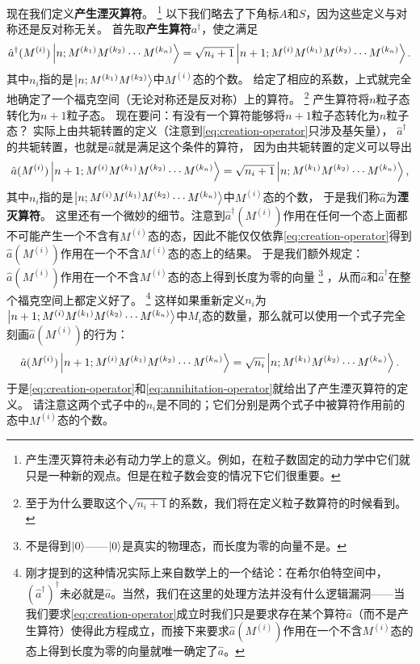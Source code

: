 \documentclass[UTF8, a4paper]{ctexart}
\begin{document}
现在我们定义\textbf{产生湮灭算符}。%
\footnote{产生湮灭算符未必有动力学上的意义。例如，在粒子数固定的动力学中它们就只是一种新的观点。但是在粒子数会变的情况下它们很重要。}%
以下我们略去了下角标$A$和$S$，因为这些定义与对称还是反对称无关。
首先取\textbf{产生算符}$a^\dagger$，使之满足
\begin{equation}
    \hat{a}^\dagger (M^{(i)}) \ket{n; M^{(k_1)} M^{(k_2)} \cdots M^{(k_n)}} = \sqrt{n_i + 1} \ket{n+1; M^{(i)} M^{(k_1)} M^{(k_2)} \cdots M^{(k_n)}}.
    \label{eq:creation-operator}
\end{equation}
其中${n_i}$指的是$\ket{n; M^{(k_1)} M^{(k_2)}}$中$M^{(i)}$态的个数。
给定了相应的系数，上式就完全地确定了一个福克空间（无论对称还是反对称）上的算符。%
\footnote{至于为什么要取这个$\sqrt{n_i + 1}$的系数，我们将在定义粒子数算符的时候看到。}
产生算符将$n$粒子态转化为$n+1$粒子态。
现在要问：有没有一个算符能够将$n+1$粒子态转化为$n$粒子态？
实际上由共轭转置的定义（注意到\eqref{eq:creation-operator}只涉及基矢量），
$\hat{a}^\dagger$的共轭转置，也就是$\hat{a}$就是满足这个条件的算符，
因为由共轭转置的定义可以导出
\[
    \hat{a} (M^{(i)}) \ket{n+1; M^{(i)} M^{(k_1)} M^{(k_2)} \cdots M^{(k_n)}} = \sqrt{n_i + 1} \ket{n; M^{(k_1)} M^{(k_2)} \cdots M^{(k_n)}},
\]
其中$n_i$指的是$\ket{n;M^{(i)} M^{(k_1)} M^{(k_2)} \cdots M^{(k_n)}}$中$M^{(i)}$态的个数，
于是我们称$\hat{a}$为\textbf{湮灭算符}。
这里还有一个微妙的细节。注意到$\hat{a}^\dagger(M^{(i)})$作用在任何一个态上面都不可能产生一个不含有$M^{(i)}$态的态，因此不能仅仅依靠\eqref{eq:creation-operator}得到$\hat{a}(M^{(i)})$作用在一个不含$M^{(i)}$态的态上的结果。
于是我们额外规定：$\hat{a}(M^{(i)})$作用在一个不含$M^{(i)}$态的态上得到长度为零的向量%
\footnote{不是得到$\ket{0}$——$\ket{0}$是真实的物理态，而长度为零的向量不是。}%
，从而$\hat{a}$和$\hat{a}^\dagger$在整个福克空间上都定义好了。%
\footnote{刚才提到的这种情况实际上来自数学上的一个结论：在希尔伯特空间中，$(\hat{a}^\dagger)^\dagger$未必就是$\hat{a}$。当然，我们在这里的处理方法并没有什么逻辑漏洞——当我们要求\eqref{eq:creation-operator}成立时我们只是要求存在某个算符$\hat{a}$（而不是产生算符）使得此方程成立，而接下来要求$\hat{a}(M^{(i)})$作用在一个不含$M^{(i)}$态的态上得到长度为零的向量就唯一确定了$\hat{a}$。}
这样如果重新定义$n_i$为$\ket{n+1; M^{(i)} M^{(k_1)} M^{(k_2)} \cdots M^{(k_n)}}$中$M_i$态的数量，那么就可以使用一个式子完全刻画$\hat{a}(M^{(i)})$的行为：
\begin{equation}
    \hat{a} (M^{(i)}) \ket{n+1; M^{(i)} M^{(k_1)} M^{(k_2)} \cdots M^{(k_n)}} = \sqrt{n_i} \ket{n; M^{(k_1)} M^{(k_2)} \cdots M^{(k_n)}}.
    \label{eq:annihitation-operator}
\end{equation}
于是\eqref{eq:creation-operator}和\eqref{eq:annihitation-operator}就给出了产生湮灭算符的定义。
请注意这两个式子中的$n_i$是不同的；它们分别是两个式子中被算符作用前的态中$M^{(i)}$态的个数。
\end{document}
